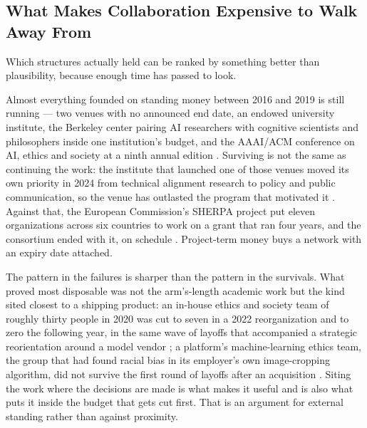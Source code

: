 \subsection{What Makes Collaboration Expensive to Walk Away From}
\label{sec:8.1.1}
Which structures actually held can be ranked by something better than plausibility, because enough time has passed to look.

Almost everything founded on standing money between 2016 and 2019 is still running — two venues with no announced end date, an endowed university institute, the Berkeley center pairing AI researchers with cognitive scientists and philosophers inside one institution's budget, and the AAAI/ACM conference on AI, ethics and society at a ninth annual edition \autocite{aiethicslab2017,miri2018alignmentforum,stanford2019hai,berkeley2016chai,aaai2026aies}. Surviving is not the same as continuing the work: the institute that launched one of those venues moved its own priority in 2024 from technical alignment research to policy and public communication, so the venue has outlasted the program that motivated it \autocite{miri2024strategy}. Against that, the European Commission's SHERPA project put eleven organizations across six countries to work on a grant that ran four years, and the consortium ended with it, on schedule \autocite{sherpa2018shaping}. Project-term money buys a network with an expiry date attached.

The pattern in the failures is sharper than the pattern in the survivals. What proved most disposable was not the arm's-length academic work but the kind sited closest to a shipping product: an in-house ethics and society team of roughly thirty people in 2020 was cut to seven in a 2022 reorganization and to zero the following year, in the same wave of layoffs that accompanied a strategic reorientation around a model vendor \autocite{techcrunch2023microsoft}; a platform's machine-learning ethics team, the group that had found racial bias in its employer's own image-cropping algorithm, did not survive the first round of layoffs after an acquisition \autocite{gizmodo2022twitter}. Siting the work where the decisions are made is what makes it useful and is also what puts it inside the budget that gets cut first. That is an argument for external standing rather than against proximity.

